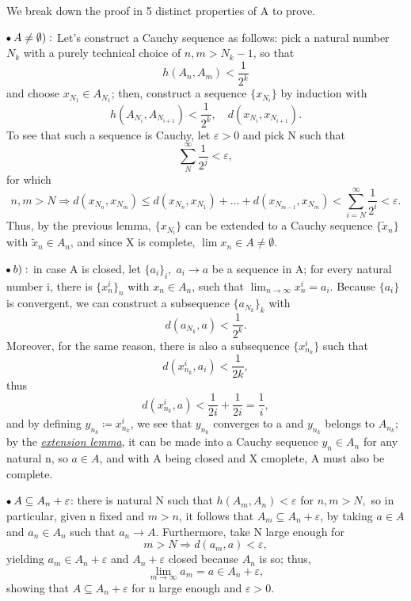 \documentclass[../fractals_everywhere.tex]{subfiles}
\begin{document}
\begin{proof*}
	We break down the proof in 5 distinct properties of A to prove.

	\(\tikz[baseline=-0.5ex]\draw[black, fill=black, radius=1.5pt](0, 0)circle;\; A \neq\emptyset):\) Let's construct a Cauchy sequence as follows: pick a natural number \(N_{k}\) with a purely technical choice of \(n, m>N_{k}-1\), so that
	\[
		h(A_{n}, A_{m})<\frac{1}{2^{k}}
	\]
	and choose \(x_{N_1}\in A_{N_1}\); then, construct a sequence \(\{x_{N_{i}}\}\) by induction with
	\[
		h(A_{N_{i}}, A_{N_{i+1}})<\frac{1}{2^{k}}, \quad d(x_{N_{i}}, x_{N_{i+1}}).
	\]
	To see that such a sequence is Cauchy, let \(\varepsilon >0\) and pick N such that
	\[
		\sum\limits_{N}^{\infty}\frac{1}{2^{j}}<\varepsilon ,
	\]
	for which
	\[
		n, m > N \Rightarrow d(x_{N_{n}}, x_{N_{m}}) \leq d(x_{N_{n}}, x_{N_{1}})+\dotsc +d(x_{N_{m-1}}, x_{N_{m}}) < \sum\limits_{i=N}^{\infty}\frac{1}{2^{i}}<\varepsilon .
	\]
	Thus, by the previous lemma, \(\{x_{N_{i}}\}\) can be extended to a Cauchy sequence \(\{\tilde{x}_{n}\}\) with \(\tilde{x}_{n}\in A_{n}\), and since X is complete, \(\lim x_{n}\in A\neq \emptyset \).

	\(\tikz[baseline=-0.5ex]\draw[black, fill=black, radius=1.5pt](0, 0)circle;\; b):\)  in case A is closed, let \(\{a_{i}\}_{i},\; a_{i}\to a\) be a sequence in A; for every natural number i, there is \(\{x_{n}^{i}\}_{n}\) with \(x_{n}\in A_{n}\), such that \(\lim_{n\to \infty}x_{n}^{i}=a_{i}\).
	Because \(\{a_{i}\}\) is convergent, we can construct a subsequence \(\{a_{N_{k}}\}_{k}\) with
	\[
		d(a_{N_{k}}, a) < \frac{1}{2^{k}}.
	\]
	Moreover, for the same reason, there is also a subsequence \(\{x_{n_{k}}^{i}\}\) such that
	\[
		d(x_{n_{k}}^{i}, a_{i}) < \frac{1}{2k},
	\]
	thus
	\[
		d(x_{n_{k}}^{i}, a) < \frac{1}{2i} + \frac{1}{2i} = \frac{1}{i},
	\]
	and by defining \(y_{n_{k}}\coloneqq x_{n_{k}}^{i}\), we see that \(y_{n_{k}}\) converges to a and \(y_{n_{k}}\) belongs to \(A_{n_{k}};\) by the \hyperlink{extension_lemma}{\textit{extension lemma}}, it can be made into a Cauchy sequence \(y_{n}\in A_{n}\) for any natural n, so \(a\in A\), and with A being closed and X cmoplete, A must also be complete.

	\(\tikz[baseline=-0.5ex]\draw[black, fill=black, radius=1.5pt](0, 0)circle;\; A\subseteq A_{n}+\varepsilon \): there is natural N such that \(h(A_{m}, A_{n})<\varepsilon \) for \(n, m > N,\) so in particular, given n fixed and \(m>n\), it follows that \(A_{m}\subseteq A_{n}+\varepsilon \), by taking \(a\in A\) and \(a_{n}\in A_{n}\) such that \(a_{n}\to A\). Furthermore, take N large enough for
	\[
		m > N \Rightarrow d(a_{m}, a) < \varepsilon ,
	\]
	yielding \(a_{m}\in A_{n}+\varepsilon \) and \(A_{n}+\varepsilon \) closed because \(A_{n}\) is so; thus,
	\[
		\lim_{m\to \infty}a_{m}=a\in A_{n}+\varepsilon ,
	\]
	showing that \(A\subseteq A_{n}+\varepsilon \) for n large enough and \(\varepsilon > 0\).


\end{proof*}
\end{document}
